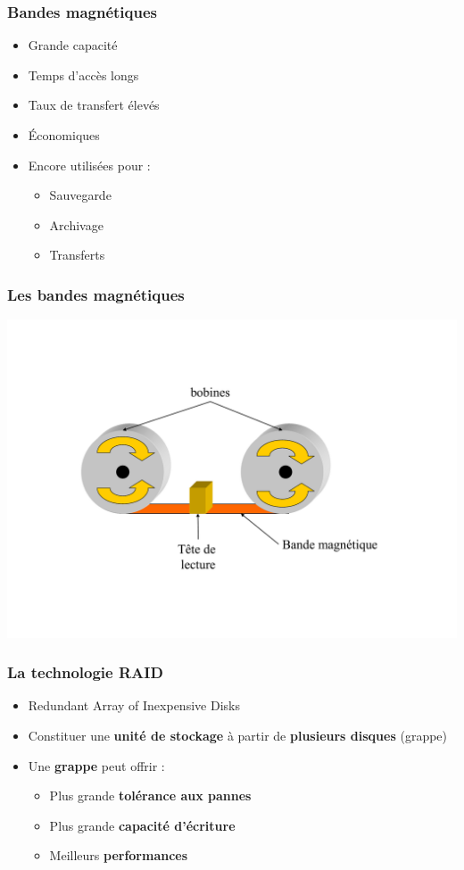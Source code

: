 \begin{frame}
\frametitle{Bandes magnétiques}
\begin{itemize}
\item Grande capacité
\item Temps d’accès longs
\item Taux de transfert élevés
\item Économiques
\item Encore utilisées pour :
\begin{itemize}
\item Sauvegarde
\item Archivage
\item Transferts
\end{itemize}
\end{itemize}
\end{frame}

\begin{frame}
\frametitle{Les bandes magnétiques}
\begin{center}
\includegraphics[height=0.8\textheight]{../illustration/bande.pdf}
\end{center}
\end{frame}


\begin{frame}
\frametitle{La technologie RAID}
\begin{itemize}
\item Redundant Array of Inexpensive Disks
\item Constituer une \textbf{unité de stockage} à partir de \textbf{plusieurs disques} (grappe)
\item Une \textbf{grappe} peut offrir :
\begin{itemize}
\item Plus grande \textbf{tolérance aux pannes}
\item Plus grande \textbf{capacité d'écriture}
\item Meilleurs \textbf{performances}
\end{itemize}
\end{itemize}
\end{frame}

